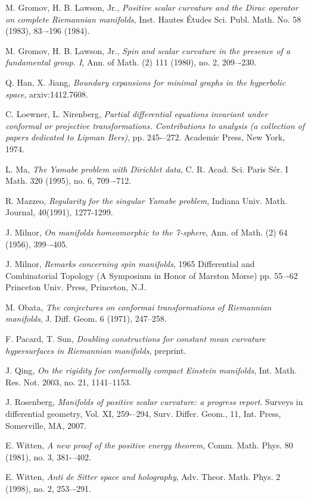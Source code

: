 \documentclass{amsart}
\theoremstyle{definition}
\theoremstyle{remark}
\numberwithin{equation}{section}
\begin{document}
\begin{thebibliography}{s}
 M. Gromov, H. B. Lawson, Jr., \emph{Positive scalar curvature and the Dirac operator on complete Riemannian manifolds}, Inst. Hautes Études Sci. Publ. Math. No. 58 (1983), 83–-196 (1984).

 M. Gromov, H. B. Lawson, Jr., \emph{Spin and scalar curvature in the presence of a fundamental group. I},
Ann. of Math. (2) 111 (1980), no. 2, 209–-230.

 Q. Han, X. Jiang, \emph{Boundary expansions for minimal graphs in the hyperbolic space}, arxiv:1412.7608.

 C. Loewner, L. Nirenberg, \emph{Partial differential equations invariant under conformal or projective transformations. Contributions to analysis (a collection of papers dedicated to Lipman Bers)}, pp. 245-–272. Academic Press, New York, 1974.

 L. Ma, \emph{The Yamabe problem with Dirichlet data}, C. R. Acad. Sci. Paris Sér. I Math. 320 (1995), no. 6, 709–-712.

 R. Mazzeo, \emph{Regularity for the singular Yamabe problem}, Indiana Univ. Math. Journal, 40(1991), 1277-1299.

 J. Milnor, \emph{On manifolds homeomorphic to the 7-sphere}, Ann. of Math. (2) 64 (1956), 399–-405.

 J. Milnor, \emph{Remarks concerning spin manifolds}, 1965 Differential and Combinatorial Topology (A Symposium in Honor of Marston Morse) pp. 55–-62 Princeton Univ. Press, Princeton, N.J.


 M. Obata, \emph{The conjectures on conformai transformations of Riemannian manifolds}, J. Diff.
Geom. 6 (1971), 247--258.




 F. Pacard, T. Sun, \emph{Doubling constructions for constant mean curvature hypersurfaces in Riemannian manifolds}, preprint.

 J. Qing, \emph{On the rigidity for conformally compact Einstein manifolds}, Int. Math. Res. Not. 2003, no. 21, 1141–1153.

 J. Rosenberg, \emph{Manifolds of positive scalar curvature: a progress report}. Surveys in differential geometry, Vol. XI, 259-–294, Surv. Differ. Geom., 11, Int. Press, Somerville, MA, 2007.


 E. Witten, \emph{A new proof of the positive energy theorem}, Comm. Math. Phys. 80 (1981), no. 3, 381-–402.

 E. Witten, \emph{Anti de Sitter space and holography},
Adv. Theor. Math. Phys. 2 (1998), no. 2, 253–-291.




\end{thebibliography}
\end{document}

